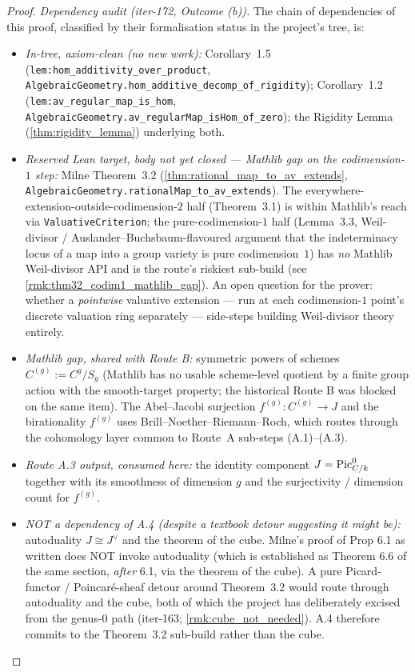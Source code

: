\begin{proof}
  \medskip
  \emph{Dependency audit (iter-172, Outcome (b)).} The chain of dependencies of this proof, classified by their formalisation status in the project's tree, is:
  \begin{itemize}
    \item \emph{In-tree, axiom-clean (no new work):} Corollary~1.5 (\texttt{lem:hom_additivity_over_product}, \texttt{AlgebraicGeometry.hom\_additive\_decomp\_of\_rigidity}); Corollary~1.2 (\texttt{lem:av_regular_map_is_hom}, \texttt{AlgebraicGeometry.av\_regularMap\_isHom\_of\_zero}); the Rigidity Lemma (\cref{thm:rigidity_lemma}) underlying both.
    \item \emph{Reserved Lean target, body not yet closed --- Mathlib gap on the codimension-\(1\) step:} Milne Theorem~3.2 (\cref{thm:rational_map_to_av_extends}, \texttt{AlgebraicGeometry.rationalMap\_to\_av\_extends}). The everywhere-extension-outside-codimension-\(2\) half (Theorem~3.1) is within Mathlib's reach via \texttt{ValuativeCriterion}; the pure-codimension-\(1\) half (Lemma~3.3, Weil-divisor / Auslander--Buchsbaum-flavoured argument that the indeterminacy locus of a map into a group variety is pure codimension~\(1\)) has \emph{no} Mathlib Weil-divisor API and is the route's riskiest sub-build (see \cref{rmk:thm32_codim1_mathlib_gap}). An open question for the prover: whether a \emph{pointwise} valuative extension --- run at each codimension-\(1\) point's discrete valuation ring separately --- side-steps building Weil-divisor theory entirely.
    \item \emph{Mathlib gap, shared with Route B:} symmetric powers of schemes \(C^{(g)} := C^g / S_g\) (Mathlib has no usable scheme-level quotient by a finite group action with the smooth-target property; the historical Route B was blocked on the same item). The Abel--Jacobi surjection \(f^{(g)} \colon C^{(g)} \to J\) and the birationality \(f^{(g)}\) uses Brill--Noether--Riemann--Roch, which routes through the cohomology layer common to Route~A sub-steps (A.1)--(A.3).
    \item \emph{Route A.3 output, consumed here:} the identity component \(J = \operatorname{Pic}^0_{C/k}\) together with its smoothness of dimension \(g\) and the surjectivity / dimension count for \(f^{(g)}\).
    \item \emph{NOT a dependency of A.4 (despite a textbook detour suggesting it might be):} autoduality \(J \cong J^\vee\) and the theorem of the cube. Milne's proof of Prop 6.1 as written does NOT invoke autoduality (which is established as Theorem 6.6 of the same section, \emph{after} 6.1, via the theorem of the cube). A pure Picard-functor / Poincar\'e-sheaf detour around Theorem~3.2 would route through autoduality and the cube, both of which the project has deliberately excised from the genus-\(0\) path (iter-163; \cref{rmk:cube_not_needed}). A.4 therefore commits to the Theorem~3.2 sub-build rather than the cube.

\end{itemize}
\end{proof}
